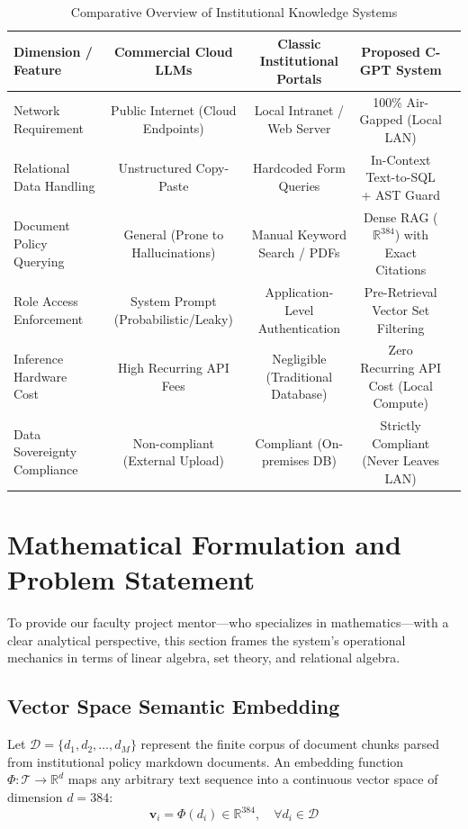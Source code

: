 \documentclass[conference]{IEEEtran}
\begin{document}
\begin{table}[t]
\centering
\caption{Comparative Overview of Institutional Knowledge Systems}
\label{tab:lit_comparison}
\begin{tabular}{@{}lcccc@{}}
\toprule
\textbf{Dimension / Feature} & \textbf{Commercial Cloud LLMs} & \textbf{Classic Institutional Portals} & \textbf{Proposed C-GPT System} \\
\midrule
Network Requirement & Public Internet (Cloud Endpoints) & Local Intranet / Web Server & 100\% Air-Gapped (Local LAN) \\
Relational Data Handling & Unstructured Copy-Paste & Hardcoded Form Queries & In-Context Text-to-SQL + AST Guard \\
Document Policy Querying & General (Prone to Hallucinations) & Manual Keyword Search / PDFs & Dense RAG ($\mathbb{R}^{384}$) with Exact Citations \\
Role Access Enforcement & System Prompt (Probabilistic/Leaky) & Application-Level Authentication & Pre-Retrieval Vector Set Filtering \\
Inference Hardware Cost & High Recurring API Fees & Negligible (Traditional Database) & Zero Recurring API Cost (Local Compute) \\
Data Sovereignty Compliance & Non-compliant (External Upload) & Compliant (On-premises DB) & Strictly Compliant (Never Leaves LAN) \\
\bottomrule
\end{tabular}
\end{table}

\section{Mathematical Formulation and Problem Statement}
To provide our faculty project mentor—who specializes in mathematics—with a clear analytical perspective, this section frames the system's operational mechanics in terms of linear algebra, set theory, and relational algebra.

\subsection{Vector Space Semantic Embedding}
Let $\mathcal{D} = \{d_1, d_2, \dots, d_M\}$ represent the finite corpus of document chunks parsed from institutional policy markdown documents. An embedding function $\Phi: \mathcal{T} \to \mathbb{R}^d$ maps any arbitrary text sequence into a continuous vector space of dimension $d = 384$:
\begin{equation}
\mathbf{v}_i = \Phi(d_i) \in \mathbb{R}^{384}, \quad \forall d_i \in \mathcal{D}
\end{equation}
\end{document}
